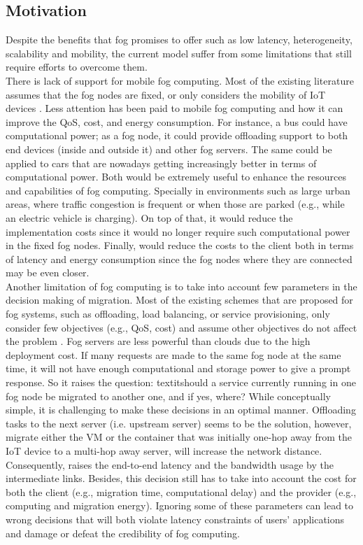 \subsection{Motivation}\label{subsec:Motivation}
\noindent\tab Despite the benefits that fog promises to offer such as low latency, heterogeneity, scalability and mobility, the current model suffer from some limitations that still require efforts to overcome them.\\
\noindent\tab There is lack of support for mobile fog computing. Most of the existing literature assumes that the fog nodes are fixed, or only considers the mobility of IoT devices \cite{yousefpour2018all}. Less attention has been paid to mobile fog computing and how it can improve the QoS, cost, and energy consumption. For instance, a bus could have computational power; as a fog node, it could provide offloading support to both end devices (inside and outside it) and other fog servers. The same could be applied to cars that are nowadays getting increasingly better in terms of computational power. Both would be extremely useful to enhance the resources and capabilities of fog computing. Specially in environments such as large urban areas, where traffic congestion is frequent or when those are parked (e.g., while an electric vehicle is charging). On top of that, it would reduce the implementation costs since it would no longer require such computational power in the fixed fog nodes. Finally, would reduce the costs to the client both in terms of latency and energy consumption since the fog nodes where they are connected may be even closer.\\
\noindent\tab Another limitation of fog computing is to take into account few parameters in the decision making of migration. Most of the existing schemes that are proposed for fog systems, such as offloading, load balancing, or service provisioning, only consider few objectives (e.g., QoS, cost) and assume other objectives do not affect the problem \cite{yousefpour2018all}. Fog servers are less powerful than clouds due to the high deployment cost. If many requests are made to the same fog node at the same time, it will not have enough computational and storage power to give a prompt response. So it raises the question: textit{should a service currently running in one fog node be migrated to another one, and if yes, where?} While conceptually simple, it is challenging to make these decisions in an optimal manner. Offloading tasks to the next server (i.e. upstream server) seems to be the solution, however, migrate either the VM or the container that was initially one-hop away from the IoT device to a multi-hop away server, will increase the network distance. Consequently, raises the end-to-end latency and the bandwidth usage by the intermediate links. Besides, this decision still has to take into account the cost for both the client (e.g., migration time, computational delay) and the provider (e.g., computing and migration energy). Ignoring some of these parameters can lead to wrong decisions that will both violate latency constraints of users' applications and damage or defeat the credibility of fog computing.
